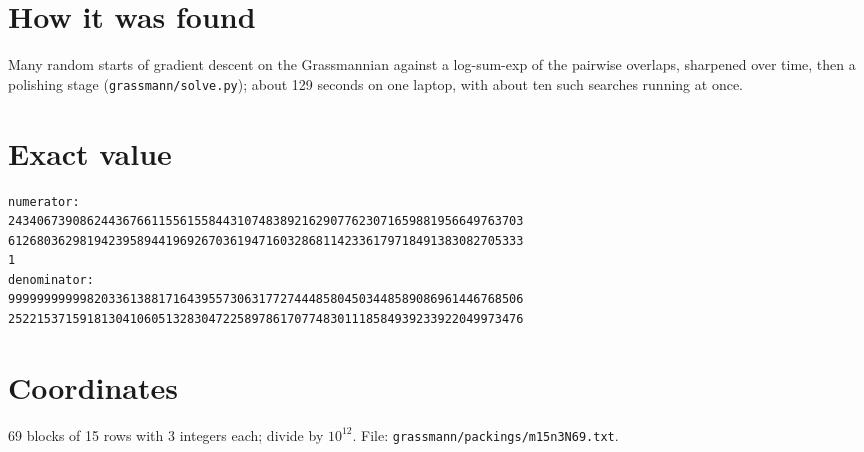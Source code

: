 \documentclass[11pt,a4paper]{article}
\begin{document}
\section{How it was found}
Many random starts of gradient descent on the Grassmannian against a log-sum-exp of the pairwise overlaps, sharpened over time, then a polishing stage (\texttt{grassmann/solve.py}); about 129 seconds on one laptop, with about ten such searches running at once.


\appendix
\section{Exact value}
{\small
\begin{verbatim}
numerator:
243406739086244367661155615584431074838921629077623071659881956649763703
612680362981942395894419692670361947160328681142336179718491383082705333
1
denominator:
999999999998203361388171643955730631772744485804503448589086961446768506
252215371591813041060513283047225897861707748301118584939233922049973476
\end{verbatim}}

\section{Coordinates}
69 blocks of 15 rows with 3 integers each; divide by $10^{12}$. File: \texttt{grassmann/packings/m15n3N69.txt}.
{\tiny
\begin{multicols}{3}
\end{multicols}}
\end{document}
